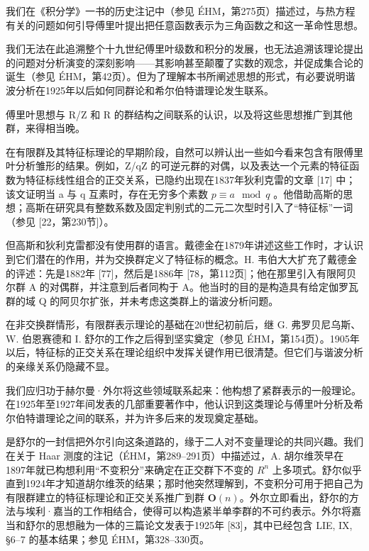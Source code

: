 
我们在《积分学》一书的历史注记中（参见 ÉHM，第275页）描述过，与热方程有关的问题如何引导傅里叶提出把任意函数表示为三角函数之和这一革命性思想。

我们无法在此追溯整个十九世纪傅里叶级数和积分的发展，也无法追溯该理论提出的问题对分析演变的深刻影响——其影响甚至颠覆了实数的观念，并促成集合论的诞生（参见 ÉHM，第42页）。但为了理解本书所阐述思想的形式，有必要说明谐波分析在1925年以后如何同群论和希尔伯特谱理论发生联系。

傅里叶思想与 R/Z 和 R 的群结构之间联系的认识，以及将这些思想推广到其他群，来得相当晚。

在有限群及其特征标理论的早期阶段，自然可以辨认出一些如今看来包含有限傅里叶分析雏形的结果。例如，Z/qZ 的可逆元群的对偶，以及表达一个元素的特征函数为特征标线性组合的正交关系，已隐约出现在1837年狄利克雷的文章 {[}17{]} 中；该文证明当 a 与 q 互素时，存在无穷多个素数 \(p \equiv a \mod q\) 。他借助高斯的思想；高斯在研究具有整数系数及固定判别式的二元二次型时引入了“特征标”一词（参见 {[}22，第230节{]}）。

但高斯和狄利克雷都没有使用群的语言。戴德金在1879年讲述这些工作时，才认识到它们潜在的作用，并为交换群定义了特征标的概念。H. 韦伯大大扩充了戴德金的评述：先是1882年 {[}77{]}，然后是1886年 {[}78，第112页{]}；他在那里引入有限阿贝尔群 A 的对偶群，并注意到后者同构于 A。他当时的目的是构造具有给定伽罗瓦群的域 Q 的阿贝尔扩张，并未考虑这类群上的谐波分析问题。

在非交换群情形，有限群表示理论的基础在20世纪初前后，继 G. 弗罗贝尼乌斯、W. 伯恩赛德和 I. 舒尔的工作之后得到坚实奠定（参见 ÉHM，第154页）。1905年以后，特征标的正交关系在理论组织中发挥关键作用已很清楚。但它们与谐波分析的亲缘关系仍隐藏不显。

我们应归功于赫尔曼·外尔将这些领域联系起来：他构想了紧群表示的一般理论。在1925年至1927年间发表的几部重要著作中，他认识到这类理论与傅里叶分析及希尔伯特谱理论之间的联系，并为许多后来的发现奠定基础。

是舒尔的一封信把外尔引向这条道路的，缘于二人对不变量理论的共同兴趣。我们在关于 Haar 测度的注记（ÉHM，第289–291页）中描述过，A. 胡尔维茨早在1897年就已构想利用“不变积分”来确定在正交群下不变的 \(R^{n}\) 上多项式。舒尔似乎直到1924年才知道胡尔维茨的结果；那时他突然理解到，不变积分可用于把自己为有限群建立的特征标理论和正交关系推广到群 \(\mathbf{O}(n)\)。外尔立即看出，舒尔的方法与埃利·嘉当的工作相结合，使得可以构造紧半单李群的不可约表示。外尔将嘉当和舒尔的思想融为一体的三篇论文发表于1925年 {[}83{]}，其中已经包含 LIE, IX, §6–7 的基本结果；参见 ÉHM，第328–330页。

